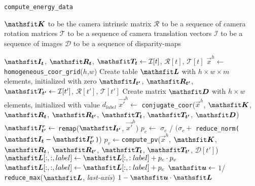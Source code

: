 \begin{algorithm}
	\caption{\texttt{compute\_energy\_data}}
	\label{alg:energy_data}	
	\begin{algorithmic}[1]
		\Require $\mat K$ to be the camera intrinsic matrix
		\Require $\mathcal{R}$ to be a sequence of camera rotation matrices
		\Require $\mathcal{T}$ to be a sequence of camera translation vectors
		\Require $\mathcal{I}$ to be a sequence of images
		\Require $\mathcal{D}$ to be a sequence of disparity-maps
		\Statex

		\State $\mat {I_t}$, $\mat {R_t}$, $\mat {T_t} \leftarrow \mathcal{I}[ t ]$, $\mathcal{R}[t]$, $\mathcal{T}[t]$
		\State $\vec x^h \leftarrow$ \texttt{homogeneous\_coor\_grid}($h$,$w$)
		\State Create table $\mat L$ with $h \times w\times m$ elements, initialized with zero
		\Statex
		\State $\mat{I_{t'}}$, $\mat {R_{t'}}$, $\mat {T_{t'}} \leftarrow \mathcal{I}[ t' ]$,  $\mathcal{R}[t']$, $\mathcal{T}[t']$
		\Statex
		\State Create matrix $\mat D$ with $h \times w$ elements, initialized with value $d_{label}$
		\State $\vec{x'}^h\leftarrow$ \texttt{conjugate\_coor}($\vec x^h$, $\mat K$, $\mat{R_{t}}$, $\mat{R_{t'}}$,  $\mat{ T_{t}}$, $\mat{ T_{t'}}$, $\mat D$)
		\State $\mat{I^r_{t'}} \leftarrow$ \texttt{remap}($\mat{I_{t'}}$, $\vec{x'}^h$)
		\State $p_c \leftarrow$  $\sigma_c$ / $(\sigma_c +$ \texttt{reduce\_norm($\mat{I_t} - \mat{I^r_{t'}}$)})
		\State $p_v \leftarrow $\texttt{compute\_pv}($\vec x^h$, $\mat K$, $\mat{R_{t}}$, $\mat{R_{t'}}$,  $\mat{ T_{t}}$, $\mat{ T_{t'}}$, $\mathcal D[t']$)
		\State $\mat L[:,:,label] \leftarrow \mat L[:,:label] + p_c\cdot p_v$
		\Else
		\State $\mat L[:,:,label] \leftarrow \mat L[:,:label] + p_c$
		\EndIf
		\EndFor
		\EndFor
		\Statex
		\State $\mat u \leftarrow$ $1$/ \texttt{reduce\_max}($\mat L$, \textit{last-axis})
		\State \Return $1 - \mat u\cdot \mat L$
		\EndProcedure
	\end{algorithmic}
\end{algorithm}

